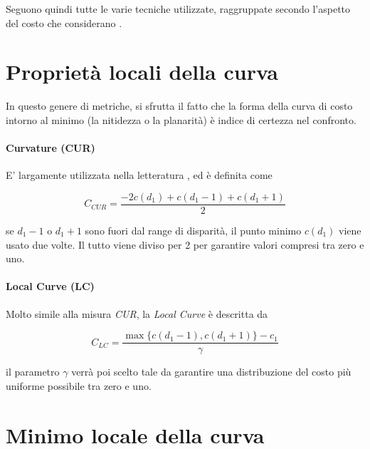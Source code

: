 \documentclass[12pt]{report}
\begin{document}
		\noindent Seguono quindi tutte le varie tecniche utilizzate, raggruppate secondo l'aspetto del costo che considerano \cite{indoors_outdoors}.
		
		
		
		\section{Proprietà locali della curva}
		\label{sec:localProperties}	
			In questo genere di metriche, si sfrutta il fatto che la forma della curva di costo intorno al minimo (la nitidezza o la planarità) è indice di certezza nel confronto.
			
			\paragraph{Curvature (CUR)}
			\label{par:curvature}
			
				E' largamente utilizzata nella letteratura \cite{indoors_outdoors}, ed è definita come
				
				\begin{equation}
					C_{CUR}=\frac{-2c(d_{1})+c(d_{1}-1)+c(d_{1}+1)}{2}
					\label{eq:CUR}
				\end{equation} 
			
				\noindent se $d_{1}-1$ o $d_{1}+1$ sono fuori dal range di disparità, il punto minimo $c(d_{1})$ viene usato due volte. Il tutto viene diviso per 2 per garantire valori compresi tra zero e uno.
			
			
			\paragraph{Local Curve (LC)} 
			\label{par:local}
			
				Molto simile alla misura \textit{CUR}, la \textit{Local Curve} è descritta da
				
				\begin{equation}
					C_{LC}=\frac {\max\bigr\{ c(d_{1}-1) ,c(d_{1}+1) \bigr\} - c_{1}} {\gamma}
					\label{eq:LC}
				\end{equation}
				
				\noindent il parametro $\gamma$ verrà poi scelto tale da garantire una distribuzione del costo più uniforme possibile tra zero e uno.
			
			
			
		\section{Minimo locale della curva}
		\label{sec:localMinima}	
		
\end{document}
